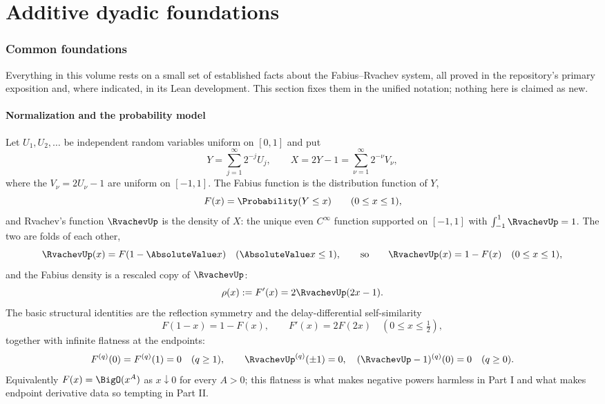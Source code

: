 \part{Additive dyadic foundations}

\section{Common foundations}
\label{sec:foundations}

Everything in this volume rests on a small set of established facts
about the Fabius--Rvachev system, all proved in the repository's primary
exposition \cite{ProveItPrimary} and, where indicated, in its Lean
development.  This section fixes them in the unified notation; nothing
here is claimed as new.

\subsection{Normalization and the probability model}
\label{sec:normalization}

Let $U_1,U_2,\ldots$ be independent random variables uniform on
$[0,1]$ and put
\begin{equation}
 Y=\sum_{j=1}^{\infty}2^{-j}U_j,
 \qquad
 X=2Y-1=\sum_{\nu=1}^{\infty}2^{-\nu}V_\nu,
 \label{eq:Y-law}
\end{equation}
where the $V_\nu=2U_\nu-1$ are uniform on $[-1,1]$.  The Fabius
function is the distribution function of $Y$,
\begin{equation}
 F(x)=\Probability(Y\le x)\qquad(0\le x\le1),
 \label{eq:F-def}
\end{equation}
and Rvachev's function $\RvachevUp$ is the density of $X$: the unique even
$C^\infty$ function supported on $[-1,1]$ with
$\int_{-1}^1\RvachevUp=1$.  The two are folds of each other,
\begin{equation}
 \RvachevUp(x)=F(1-\AbsoluteValue x)\quad(\AbsoluteValue x\le1),
 \qquad\text{so}\qquad
 \RvachevUp(x)=1-F(x)\quad(0\le x\le1),
 \label{eq:up-fold}
\end{equation}
and the Fabius density is a rescaled copy of $\RvachevUp$:
\begin{equation}
 \rho(x):=F'(x)=2\RvachevUp(2x-1).
 \label{eq:fabius-density}
\end{equation}
The basic structural identities are the reflection symmetry and the
delay-differential self-similarity
\begin{equation}
 F(1-x)=1-F(x),
 \qquad
 F'(x)=2F(2x)\quad(0\le x\le\tfrac12),
 \label{eq:F-symmetry}
\end{equation}
together with infinite flatness at the endpoints:
\begin{equation}
 F^{(q)}(0)=F^{(q)}(1)=0
 \quad(q\ge1),
 \qquad
 \RvachevUp^{(q)}(\pm1)=0,\quad
 (\RvachevUp-1)^{(q)}(0)=0\quad(q\ge0).
 \label{eq:flatness}
\end{equation}
Equivalently $F(x)=\BigO(x^A)$ as $x\downarrow0$ for every $A>0$; this
flatness is what makes negative powers harmless in Part I and what makes
endpoint derivative data so tempting in Part II.

